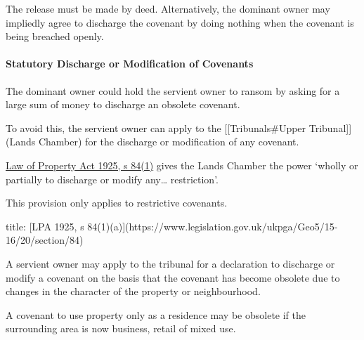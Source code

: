 \documentclass[
]{article}
\newenvironment{Shaded}{}{}
\newcommand{\NormalTok}[1]{#1}
\begin{document}
The release must be made by deed. Alternatively, the dominant owner may
impliedly agree to discharge the covenant by doing nothing when the
covenant is being breached openly.

\hypertarget{statutory-discharge-or-modification-of-covenants}{%
\paragraph{Statutory Discharge or Modification of
Covenants}\label{statutory-discharge-or-modification-of-covenants}}

The dominant owner could hold the servient owner to ransom by asking for
a large sum of money to discharge an obsolete covenant.

To avoid this, the servient owner can apply to the
{[}{[}Tribunals\#Upper Tribunal{]}{]} (Lands Chamber) for the discharge
or modification of any covenant.

\href{https://www.legislation.gov.uk/ukpga/Geo5/15-16/20/section/84}{Law
of Property Act 1925, s 84(1)} gives the Lands Chamber the power `wholly
or partially to discharge or modify any\ldots{} restriction'.

\begin{Shaded}
\begin{Highlighting}[]
\NormalTok{This provision only applies to restrictive covenants.}
\end{Highlighting}
\end{Shaded}

\begin{Shaded}
\begin{Highlighting}[]
\NormalTok{title: [LPA 1925, s 84(1)(a)](https://www.legislation.gov.uk/ukpga/Geo5/15{-}16/20/section/84)}

\NormalTok{A servient owner may apply to the tribunal for a declaration to discharge or modify a covenant on the basis that the covenant has become obsolete due to changes in the character of the property or neighbourhood.}
\end{Highlighting}
\end{Shaded}

\begin{Shaded}
\begin{Highlighting}[]
\NormalTok{A covenant to use property only as a residence may be obsolete if the surrounding area is now business, retail of mixed use.}
\end{Highlighting}
\end{Shaded}
\end{document}
